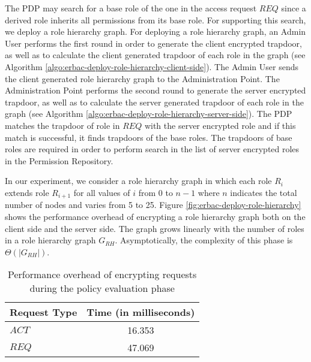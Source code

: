 \documentclass[epsfig,a4paper,11pt,titlepage]{book}
\numberwithin{algorithm}{chapter}
\begin{document}
The \gls{PDP} may search for a base role of the one in the access request $\mathit{REQ}$ since a derived role inherits all permissions from its base role. For supporting this search, we deploy a role hierarchy graph. For deploying a role hierarchy graph, an Admin User performs the first round in order to generate the client encrypted trapdoor, as well as to calculate the client generated trapdoor of each role in the graph (see Algorithm \ref{algo:erbac-deploy-role-hierarchy-client-side}). The Admin User sends the client generated role hierarchy graph to the Administration Point. The Administration Point performs the second round to generate the server encrypted trapdoor, as well as to calculate the server generated trapdoor of each role in the graph (see Algorithm \ref{algo:erbac-deploy-role-hierarchy-server-side}). The \gls{PDP} matches the trapdoor of role in $\mathit{REQ}$ with the server encrypted role and if this match is successful, it finds trapdoors of the base roles. The trapdoors of base roles are required in order to perform search in the list of server encrypted roles in the Permission Repository.

In our experiment, we consider a role hierarchy graph in which each role $R_i$ extends role $R_{i+1}$ for all values of $i$ from 0 to $n - 1$ where $n$ indicates the total number of nodes and varies from 5 to 25. Figure \ref{fig:erbac-deploy-role-hierarchy} shows the performance overhead of encrypting a role hierarchy graph both on the client side and the server side. The graph grows linearly with the number of roles in a role hierarchy graph $G_{RH}$. Asymptotically, the complexity of this phase is ${\Theta}(|G_{RH}|)$.


\begin{table} [htp]
\centering
\caption[Performance overhead of encrypting requests]{Performance overhead of encrypting requests during the policy evaluation phase}
\label{tab:erbac-request}
\begin{tabular}{ |l|c| }
\hline
\textbf{Request Type} & \textbf{Time (in milliseconds)} \\ \hline
$\mathit{ACT}$ & 16.353 \\ \hline
$\mathit{REQ}$ & 47.069 \\ \hline
\end{tabular}
\end{table}
\end{document}
